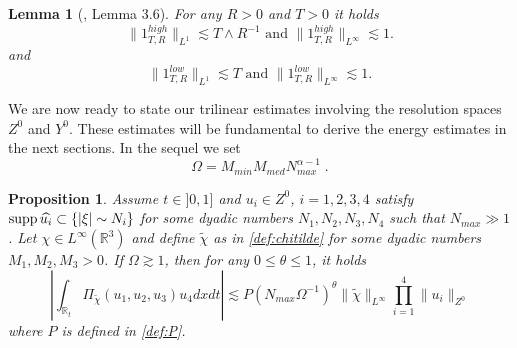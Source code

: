\documentclass{amsart}
\newtheorem{lemma}[theorem]{Lemma}
\newtheorem{proposition}[theorem]{Proposition}
\theoremstyle{definition}
\theoremstyle{remark}
\def\R{{\mathbb R}}
\numberwithin{equation}{section}
\def\supp{\mathop{\rm supp}\nolimits}
\begin{document}
\begin{lemma}[\cite{MPV3}, Lemma 3.6]\label{ihigh-lem} For any $ R>0 $ and $ T>0 $ it holds
\begin{equation}\label{high}
\|1_{T,R}^{high}\|_{L^1}\lesssim T\wedge R^{-1}  \textrm{ and } \|1_{T,R}^{high}\|_{L^\infty}\lesssim 1.
\end{equation}
and
\begin{equation}\label{low}
\|1_{T,R}^{low}\|_{L^1} \lesssim T \textrm{ and } \|1_{T,R}^{low}\|_{L^\infty}\lesssim  1.
\end{equation}
\end{lemma}

We are now ready to state our trilinear estimates involving the resolution spaces $Z^0$ and $Y^0$. These estimates will be fundamental to derive the energy estimates in the next sections. 
In the sequel we set 
\begin{equation}\label{defOmega}
\Omega = M_{min}M_{med}N_{max}^{\alpha-1} \; .
\end{equation}
\begin{proposition}\label{prop:l2tri}
  Assume $t\in ]0,1]$ and $u_i\in Z^0$, $i=1,2,3,4$ satisfy $\supp \widehat{u_i}\subset \{|\xi|\sim N_i\}$ for some dyadic numbers $N_1, N_2, N_3, N_4$ such that $N_{max}\gg 1$. Let $\chi\in L^\infty(\R^3)$ and define $\widetilde{\chi}$ as in \eqref{def:chitilde} for some dyadic numbers $M_1,M_2,M_3>0$. If $\Omega \gtrsim 1$, then for any $0\le\theta\le 1$, it holds
  \begin{equation}\label{l2tri.1}
    \left|\int_{\R_t} \Pi_{\widetilde{\chi}}(u_1,u_2,u_3)u_4 dxdt\right| \lesssim P(N_{max}\Omega^{-1})^\theta \|\widetilde{\chi}\|_{L^\infty} \prod_{i=1}^4 \|u_i\|_{Z^0}
  \end{equation}
  where $P$ is defined in \eqref{def:P}.
\end{proposition}
\end{document}
